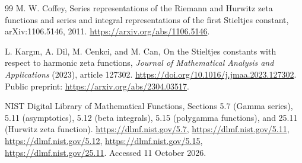 \documentclass[11pt,a4paper]{article}
\numberwithin{equation}{section}
\theoremstyle{definition}
\begin{document}
\begin{thebibliography}{99}
M. W. Coffey, Series representations of the Riemann and Hurwitz zeta
functions and series and integral representations of the first
Stieltjes constant, arXiv:1106.5146, 2011.
\url{https://arxiv.org/abs/1106.5146}.

L. Karg\i n, A. Dil, M. Cenkci, and M. Can,
On the Stieltjes constants with respect to harmonic zeta functions,
\emph{Journal of Mathematical Analysis and Applications} (2023),
article 127302.
\url{https://doi.org/10.1016/j.jmaa.2023.127302}.
Public preprint: \url{https://arxiv.org/abs/2304.03517}.

NIST Digital Library of Mathematical Functions,
Sections 5.7 (Gamma series), 5.11 (asymptotics), 5.12 (beta integrals),
5.15 (polygamma functions), and 25.11 (Hurwitz zeta function).
\url{https://dlmf.nist.gov/5.7},
\url{https://dlmf.nist.gov/5.11},
\url{https://dlmf.nist.gov/5.12},
\url{https://dlmf.nist.gov/5.15},
\url{https://dlmf.nist.gov/25.11}.
Accessed 11 October 2026.

\end{thebibliography}

\end{document}
